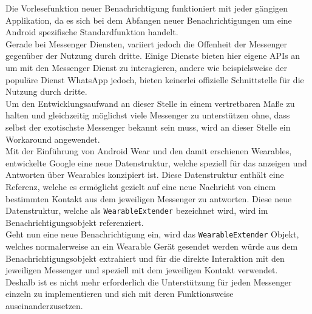 Die Vorlesefunktion neuer Benachrichtigung funktioniert mit jeder gängigen Applikation, da es sich bei dem Abfangen neuer Benachrichtigungen um eine Android spezifische Standardfunktion handelt.\\
Gerade bei Messenger Diensten, variiert jedoch die Offenheit der Messenger gegenüber der Nutzung durch dritte. Einige Dienste bieten hier eigene \ac{API}s an um mit den Messenger Dienst zu interagieren, andere wie beispielsweise der populäre Dienst WhatsApp jedoch, bieten keinerlei offizielle Schnittstelle für die Nutzung durch dritte.\\
Um den Entwicklungsaufwand an dieser Stelle in einem vertretbaren Maße zu halten und gleichzeitig möglichst viele Messenger zu unterstützen ohne, dass selbst der exotischste Messenger bekannt sein muss, wird an dieser Stelle ein Workaround angewendet.\\
Mit der Einführung von Android Wear und den damit erschienen \gls{Wearables}, entwickelte Google eine neue Datenstruktur, welche speziell für das anzeigen und Antworten über Wearables konzipiert ist. Diese Datenstruktur enthält eine Referenz, welche es ermöglicht gezielt auf eine neue Nachricht von einem bestimmten Kontakt aus dem jeweiligen Messenger zu antworten. Diese neue Datenstruktur, welche als \texttt{WearableExtender} bezeichnet wird, wird im Benachrichtigungsobjekt referenziert.\\
Geht nun eine neue Benachrichtigung ein, wird das \texttt{WearableExtender} Objekt, welches normalerweise an ein Wearable Gerät gesendet werden würde aus dem Benachrichtigungsobjekt extrahiert und für die direkte Interaktion mit den jeweiligen Messenger und speziell mit dem jeweiligen Kontakt verwendet.\\
Deshalb ist es nicht mehr erforderlich die Unterstützung für jeden Messenger einzeln zu implementieren und sich mit deren Funktionsweise auseinanderzusetzen.
